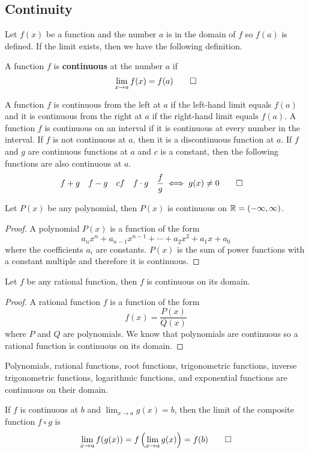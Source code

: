 \subsection{Continuity}
Let \(f(x)\) be a function and the number \(a\) is in the domain of \(f\) so
\(f(a)\) is defined.
If the limit exists, then we have the following definition.
\begin{definition}
    A function \(f\) is \textbf{continuous} at the number \(a\) if
    \[\lim_{x\to a}f(x)=f(a)\qedhere\]
\end{definition}
A function \(f\) is continuous from the left at \(a\) if the left-hand limit
equals \(f(a)\) and it is continuous from the right at \(a\) if the right-hand
limit equals \(f(a)\).
A function \(f\) is continuous on an interval if it is continuous
at every number in the interval.
If \(f\) is not continuous at \(a\), then it is a discontinuous function at \(a\).
If \(f\) and \(g\) are continuous functions at \(a\) and \(c\) is a constant,
then the following functions are also continuous at \(a\).
    \begin{align*}
        &f+g&f-g&&cf&&f\cdot g&&\dfrac{f}{g}\iff g(x)\neq 0&\qedhere
    \end{align*}
\begin{theorem}
    Let \(P(x)\) be any polynomial, then \(P(x)\) is continuous on
    \(\mathbb{R}=(-\infty,\infty)\).
\end{theorem}
\begin{proof}
    A polynomial \(P(x)\) is a function of the form
    \[a_nx^n+a_{n-1}x^{n-1}+\dotsb +a_{2}x^{2}+a_1x+a_0\]
    where the coefficients \(a_i\) are constants.
    \(P(x)\) is the sum of power functions with a constant multiple and
    therefore it is continuous.
\end{proof}
\begin{theorem}
    Let \(f\) be any rational function, then \(f\) is continuous on its domain.
\end{theorem}
\begin{proof}
    A rational function \(f\) is a function of the form
    \[f(x)=\frac{P(x)}{Q(x)}\] where \(P\) and \(Q\) are polynomials.
    We know that polynomials are continuous so a rational function is
    continuous on its domain.
\end{proof}
Polynomials, rational functions, root functions, trigonometric
functions, inverse trigonometric functions, logarithmic functions, and
exponential functions are continuous on their domain.
\begin{theorem}
    If \(f\) is continuous at \(b\) and \(\lim_{x\to a}g(x)=b\), then
    the limit of the composite function \(f\circ g\) is
    \[\lim_{x\to a}f(g(x))=f\left(\lim_{x\to a}g(x)\right)=f(b)\qedhere\]
\end{theorem}
